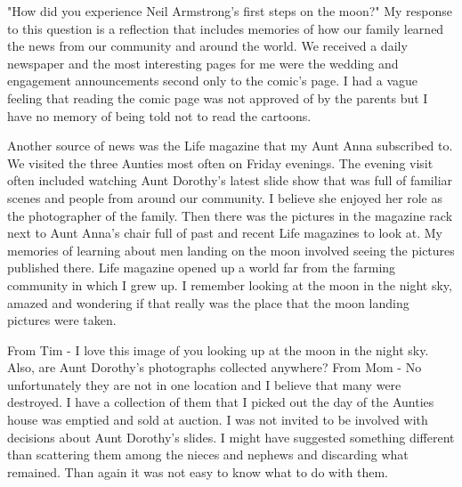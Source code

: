 "How did you experience Neil Armstrong's first steps on the moon?"
My response to this question is a reflection that includes memories of how our family learned the news from our community and around the world.
We received a daily newspaper and the most interesting pages for me were the wedding and engagement announcements second only to the comic's page.
I had a vague feeling that reading the comic page was not approved of by the parents but I have no memory of being told not to read the cartoons.

Another source of news was the Life magazine that my Aunt Anna subscribed to.
We visited the three Aunties most often on Friday evenings.
The evening visit often included watching Aunt Dorothy's latest slide show that was full of familiar scenes and people from around our community.
I believe she enjoyed her role as the photographer of the family.
Then there was the pictures in the magazine rack next to Aunt Anna's chair full of past and recent Life magazines to look at.
My memories of learning about men landing on the moon involved seeing the pictures published there.
Life magazine opened up a world far from the farming community in which I grew up.
I remember looking at the moon in the night sky, amazed and wondering if that really was the place that the moon landing pictures were taken.

From Tim - I love this image of you looking up at the moon in the night sky.
Also, are Aunt Dorothy's photographs collected anywhere?
From Mom - No unfortunately they are not in one location and I believe that many were destroyed.
I have a collection of them that I picked out the day of the Aunties house was emptied and sold at auction.
I was not invited to be involved with decisions about Aunt Dorothy's slides.
I might have suggested something different than scattering them among the nieces and nephews and discarding what remained.
Than again it was not easy to know what to do with them.







